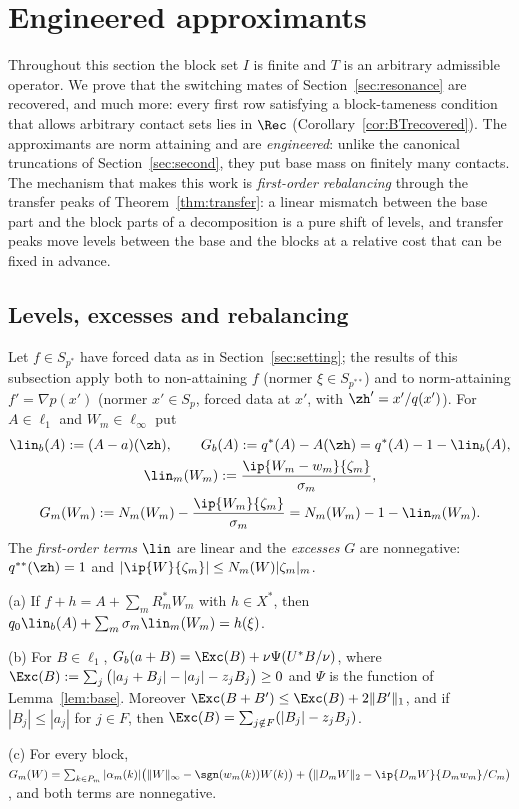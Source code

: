 \section{Engineered approximants}\label{sec:engineered}

Throughout this section the block set $I$ is finite and $T$ is an arbitrary
admissible operator.  We prove that the switching mates of
Section~\ref{sec:resonance} are recovered, and much more: every first row
satisfying a block-tameness condition that allows arbitrary contact sets
lies in $\Rec$ (Corollary~\ref{cor:BTrecovered}).  The approximants are
norm attaining and are \emph{engineered}: unlike the canonical truncations
of Section~\ref{sec:second}, they put base mass on finitely many contacts.
The mechanism that makes this work is \emph{first-order rebalancing}
through the transfer peaks of Theorem~\ref{thm:transfer}: a linear
mismatch between the base part and the block parts of a decomposition is a
pure shift of levels, and transfer peaks move levels between the base and
the blocks at a relative cost that can be fixed in advance.

\subsection{Levels, excesses and rebalancing}
Let $f\in S_{p^*}$ have forced data as in Section~\ref{sec:setting}; the
results of this subsection apply both to non-attaining $f$ (normer
$\xi\in S_{p^{**}}$) and to norm-attaining $f'=\nabla p(x')$ (normer
$x'\in S_p$, forced data at $x'$, with $\zh'=x'/q(x')$).  For $A\in\ell_1$
and $W_m\in\ell_\infty$ put
\begin{gather*}
 \lin_b(A):=(A-a)(\zh),\qquad G_b(A):=q^*(A)-A(\zh)=q^*(A)-1-\lin_b(A),\\
 \lin_m(W_m):=\frac{\ip{W_m-w_m}{\zeta_m}}{\sigma_m},\\
 G_m(W_m):=N_m(W_m)-\frac{\ip{W_m}{\zeta_m}}{\sigma_m}
 =N_m(W_m)-1-\lin_m(W_m).
\end{gather*}
The \emph{first-order terms} $\lin$ are linear and the \emph{excesses} $G$
are nonnegative: $q^{**}(\zh)=1$ and $|\ip{W}{\zeta_m}|\le
N_m(W)|\zeta_m|_m$.

\begin{lemma}\label{lem:bookkeeping}
\textup{(a)} If $f+h=A+\sum_mR_m^*W_m$ with $h\in X^*$, then
$q_0\lin_b(A)+\sum_m\sigma_m\lin_m(W_m)=h(\xi)$.

\textup{(b)} For $B\in\ell_1$,
$G_b(a+B)=\Exc(B)+\nu\Psi(U^*B/\nu)$, where
$\Exc(B):=\sum_j\big(|a_j+B_j|-|a_j|-z_jB_j\big)\ge0$ and $\Psi$ is the
function of Lemma~\ref{lem:base}.  Moreover $\Exc(B+B')\le\Exc(B)+
2\|B'\|_1$, and if $|B_j|\le|a_j|$ for $j\in F$, then
$\Exc(B)=\sum_{j\notin F}(|B_j|-z_jB_j)$.

\textup{(c)} For every block, $G_m(W)=\sum_{k\in P_m}|\alpha_m(k)|
\big(\|W\|_\infty-\sgn(w_m(k))W(k)\big)+\big(\|D_mW\|_2-\ip{D_mW}{D_mw_m}/C_m
\big)$, and both terms are nonnegative.
\end{lemma}


